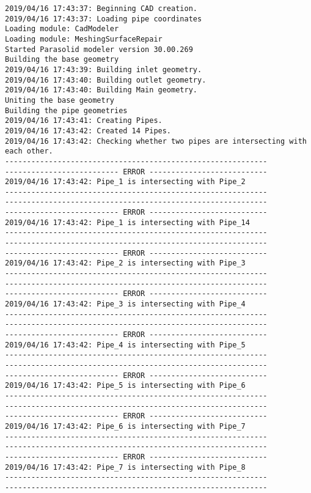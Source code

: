 \documentclass{article}
\begin{document}
{\tiny 
\begin{verbatim}
2019/04/16 17:43:37: Beginning CAD creation.
2019/04/16 17:43:37: Loading pipe coordinates
Loading module: CadModeler
Loading module: MeshingSurfaceRepair
Started Parasolid modeler version 30.00.269
Building the base geometry
2019/04/16 17:43:39: Building inlet geometry.
2019/04/16 17:43:40: Building outlet geometry.
2019/04/16 17:43:40: Building Main geometry.
Uniting the base geometry
Building the pipe geometries
2019/04/16 17:43:41: Creating Pipes.
2019/04/16 17:43:42: Created 14 Pipes.
2019/04/16 17:43:42: Checking whether two pipes are intersecting with each other.
------------------------------------------------------------
-------------------------- ERROR ---------------------------
2019/04/16 17:43:42: Pipe_1 is intersecting with Pipe_2
------------------------------------------------------------
------------------------------------------------------------
-------------------------- ERROR ---------------------------
2019/04/16 17:43:42: Pipe_1 is intersecting with Pipe_14
------------------------------------------------------------
------------------------------------------------------------
-------------------------- ERROR ---------------------------
2019/04/16 17:43:42: Pipe_2 is intersecting with Pipe_3
------------------------------------------------------------
------------------------------------------------------------
-------------------------- ERROR ---------------------------
2019/04/16 17:43:42: Pipe_3 is intersecting with Pipe_4
------------------------------------------------------------
------------------------------------------------------------
-------------------------- ERROR ---------------------------
2019/04/16 17:43:42: Pipe_4 is intersecting with Pipe_5
------------------------------------------------------------
------------------------------------------------------------
-------------------------- ERROR ---------------------------
2019/04/16 17:43:42: Pipe_5 is intersecting with Pipe_6
------------------------------------------------------------
------------------------------------------------------------
-------------------------- ERROR ---------------------------
2019/04/16 17:43:42: Pipe_6 is intersecting with Pipe_7
------------------------------------------------------------
------------------------------------------------------------
-------------------------- ERROR ---------------------------
2019/04/16 17:43:42: Pipe_7 is intersecting with Pipe_8
------------------------------------------------------------
------------------------------------------------------------

\end{verbatim}}
\end{document}
